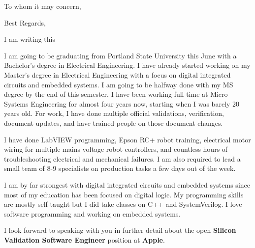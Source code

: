 \documentclass[letterpaper]{moderncv}        %
\begin{document}
    
\date{\today}
\opening{To whom it may concern,}
\closing{Best Regards,}
\makelettertitle

\indent I am writing this 

I am going to be graduating from Portland State University this June with a Bachelor's degree in Electrical Engineering.  I have already started working on my Master's degree in Electrical Engineering with a focus on digital integrated circuits and embedded systems.  I am going to be halfway done with my MS degree by the end of this semester.  I have been working full time at Micro Systems Engineering for almost four years now, starting when I was barely 20 years old.   For work, I have done multiple official validations, verification, document updates, and have trained people on those document changes. 

I have done LabVIEW programming, Epson RC+ robot training, electrical motor wiring for multiple mains voltage robot controllers, and countless hours of troubleshooting electrical and mechanical failures.  I am also required to lead a small team of 8-9 specialists on production tasks a few days out of the week.

I am by far strongest with digital integrated circuits and embedded systems since most of my education has been focused on digital logic.  My programming skills are mostly self-taught but I did take classes on C++ and SystemVerilog.  I love software programming and working on embedded systems.
  
I look forward to speaking with you in further detail about the open \textbf{Silicon Validation Software Engineer} position at \textbf{Apple}.






\makeletterclosing
\end{document}
